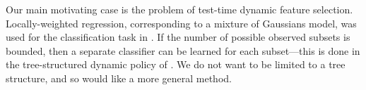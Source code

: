 Our main motivating case is the problem of test-time dynamic feature selection.
Locally-weighted regression, corresponding to a mixture of Gaussians model, was used for the classification task in \cite{Gao-NIPS-2011}.
If the number of possible observed subsets is bounded, then a separate classifier can be learned for each subset---this is done in the tree-structured dynamic policy of \cite{Xu-ICML-2013}.
We do not want to be limited to a tree structure, and so would like a more general method.
